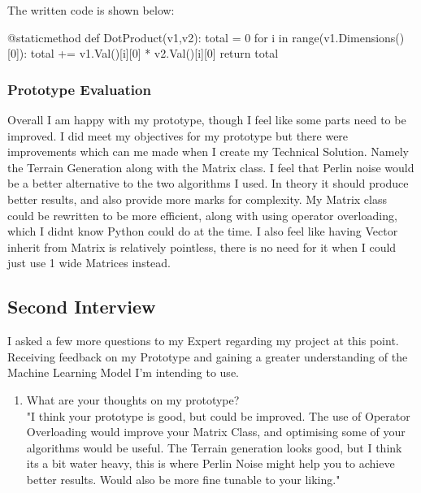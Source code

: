 \begin{flushleft}
\begin{enumerate}
                        The written code is shown below:
                        \begin{pythoncode}
@staticmethod
def DotProduct(v1,v2):
    total = 0
    for i in range(v1.Dimensions()[0]):
        total += v1.Val()[i][0] * v2.Val()[i][0]
    return total
                        \end{pythoncode}
                \end{enumerate}
            \subsubsection{Prototype Evaluation}
                \vspace{0.2cm}
                Overall I am happy with my prototype, though I feel like some parts need to be improved. I did meet my 
                objectives for my prototype but there were improvements which can me made when I create my Technical Solution. 
                Namely the Terrain Generation along with the Matrix class. I feel that Perlin noise would be a better alternative
                to the two algorithms I used. In theory it should produce better results, and also provide more marks for 
                complexity. My Matrix class could be rewritten to be more efficient, along with using operator overloading, which
                I didnt know Python could do at the time. I also feel like having Vector inherit from Matrix is relatively pointless,
                there is no need for it when I could just use 1 wide Matrices instead.
        \subsection{Second Interview}
            \vspace{0.2cm}
            I asked a few more questions to my Expert regarding my project at this point. Receiving feedback on my Prototype and gaining a
            greater understanding of the Machine Learning Model I'm intending to use. \\
            \vspace{0.2cm}

            \begin{enumerate}
                \item What are your thoughts on my prototype? \\ 
                    \vspace{0.2cm}
                    "I think your prototype is good, but could be improved. The use of Operator Overloading would improve your Matrix Class,
                    and optimising some of your algorithms would be useful. The Terrain generation looks good, but I think its a bit
                    water heavy, this is where Perlin Noise might help you to achieve better results. Would also be more fine tunable to
                    your liking."


\end{enumerate}
\end{flushleft}
